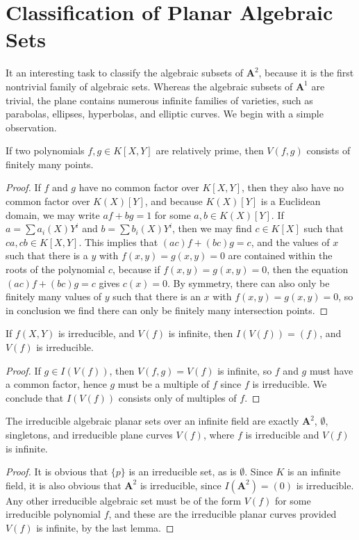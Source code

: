 \section{Classification of Planar Algebraic Sets}

It an interesting task to classify the algebraic subsets of $\mathbf{A}^2$, because it is the first nontrivial family of algebraic sets. Whereas the algebraic subsets of $\mathbf{A}^1$ are trivial, the plane contains numerous infinite families of varieties, such as parabolas, ellipses, hyperbolas, and elliptic curves. We begin with a simple observation.

\begin{theorem}
    If two polynomials $f,g \in K[X,Y]$ are relatively prime, then $V(f,g)$ consists of finitely many points.
\end{theorem}
\begin{proof}
    If $f$ and $g$ have no common factor over $K[X,Y]$, then they also have no common factor over $K(X)[Y]$, and because $K(X)[Y]$ is a Euclidean domain, we may write $af + bg = 1$ for some $a,b \in K(X)[Y]$. If $a = \sum a_i(X)Y^i$ and $b = \sum b_i(X) Y^i$, then we may find $c \in K[X]$ such that $ca, cb \in K[X,Y]$. This implies that $(ac)f + (bc)g = c$, and the values of $x$ such that there is a $y$ with $f(x,y) = g(x,y) = 0$ are contained within the roots of the polynomial $c$, because if $f(x,y) = g(x,y) = 0$, then the equation $(ac)f + (bc)g = c$ gives $c(x) = 0$. By symmetry, there can also only be finitely many values of $y$ such that there is an $x$ with $f(x,y) = g(x,y) = 0$, so in conclusion we find there can only be finitely many intersection points.
\end{proof}

\begin{corollary}
    If $f(X,Y)$ is irreducible, and $V(f)$ is infinite, then $I(V(f)) = (f)$, and $V(f)$ is irreducible.
\end{corollary}
\begin{proof}
    If $g \in I(V(f))$, then $V(f,g) = V(f)$ is infinite, so $f$ and $g$ must have a common factor, hence $g$ must be a multiple of $f$ since $f$ is irreducible. We conclude that $I(V(f))$ consists only of multiples of $f$.
\end{proof}

\begin{corollary}
    The irreducible algebraic planar sets over an infinite field are exactly $\mathbf{A}^2$, $\emptyset$, singletons, and irreducible plane curves $V(f)$, where $f$ is irreducible and $V(f)$ is infinite.
\end{corollary}
\begin{proof}
    It is obvious that $\{ p \}$ is an irreducible set, as is $\emptyset$. Since $K$ is an infinite field, it is also obvious that $\mathbf{A}^2$ is irreducible, since $I(\mathbf{A}^2) = (0)$ is irreducible. Any other irreducible algebraic set must be of the form $V(f)$ for some irreducible polynomial $f$, and these are the irreducible planar curves provided $V(f)$ is infinite, by the last lemma.
\end{proof}

